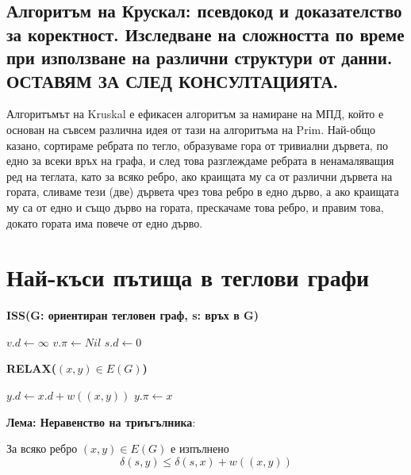 \documentclass{article}
\renewcommand{\\}{\newline}
\begin{document}
\subsection{Алгоритъм на Крускал: псевдокод и доказателство за коректност. Изследване на сложността по време при използване на различни структури от данни. ОСТАВЯМ ЗА СЛЕД КОНСУЛТАЦИЯТА.}

Алгоритъмът на Kruskal е ефикасен алгоритъм за намиране на МПД, който е основан на съвсем различна идея от тази на алгоритъма на Prim. Най-общо казано, сортираме ребрата по тегло, образуваме гора от тривиални дървета, по едно за всеки връх на графа, и след това разглеждаме ребрата в ненамаляващия ред на теглата, като за всяко ребро, ако краищата му са от различни дървета на гората, сливаме тези (две) дървета чрез това ребро в едно дърво, а ако краищата му са от едно и също дърво на гората, прескачаме това ребро, и правим това, докато гората има повече от едно дърво.

\newpage

\section{Най-къси пътища в теглови графи}

\textbf{ISS(G: ориентиран тегловен граф, s: връх в G)}
\begin{algorithmic}[1]
  \State \(v.d \gets \infty\)  
  \State \(v.\pi \gets Nil\)  
\EndFor
\State  \(s.d \gets 0 \)  
\end{algorithmic}
\vspace{1cm}
\textbf{RELAX(\((x,y) \in E(G)\))}
\begin{algorithmic}[1]
  \State \(y.d \gets x.d + w((x,y)) \) 
  \State  \(y.\pi \gets x \)
\EndIf
\end{algorithmic}


\textbf{Лема: Неравенство на триъгълника}:

За всяко ребро \((x, y) \in E(G)\) е изпълнено
\[
\delta(s, y) \le \delta(s, x) + w((x, y))
\]
\end{document}
